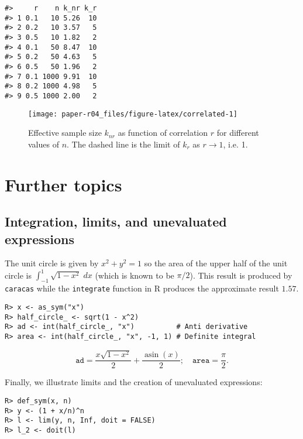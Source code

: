 \begin{verbatim}
#>     r    n k_nr k_r
#> 1 0.1   10 5.26  10
#> 2 0.2   10 3.57   5
#> 3 0.5   10 1.82   2
#> 4 0.1   50 8.47  10
#> 5 0.2   50 4.63   5
#> 6 0.5   50 1.96   2
#> 7 0.1 1000 9.91  10
#> 8 0.2 1000 4.98   5
#> 9 0.5 1000 2.00   2
\end{verbatim}

\begin{figure}[h]
\texttt{[image: paper-r04\_files/figure-latex/correlated-1]} \caption{Effective sample size $k_{nr}$ as function of correlation $r$ for different values of $n$. The dashed line is the limit of $k_r$ as $r \rightarrow 1$, i.e. 1. }\label{fig:correlated}
\end{figure}

\hypertarget{further-topics}{%
\section{Further topics}\label{further-topics}}

\hypertarget{integration-limits-and-unevaluated-expressions}{%
\subsection{Integration, limits, and unevaluated expressions}\label{integration-limits-and-unevaluated-expressions}}

The unit circle is given by \(x^2 + y^2 = 1\) so the area of the upper
half of the unit circle is \(\int_{-1}^1 \sqrt{1-x^2}\; dx\) (which is
known to be \(\pi/2\)). This result is produced by \texttt{caracas} while the
\texttt{integrate} function in R produces the approximate result \(1.57\).

\begin{verbatim}
R> x <- as_sym("x")
R> half_circle_ <- sqrt(1 - x^2)
R> ad <- int(half_circle_, "x")          # Anti derivative
R> area <- int(half_circle_, "x", -1, 1) # Definite integral
\end{verbatim}

\begin{equation}
\texttt{ad} = \frac{x \sqrt{1 - x^{2}}}{2} + \frac{\operatorname{asin}{\left(x \right)}}{2}; \quad
\texttt{area} = \frac{\pi}{2}.
\end{equation}

Finally, we illustrate limits and the creation of unevaluated expressions:

\begin{verbatim}
R> def_sym(x, n)
R> y <- (1 + x/n)^n
R> l <- lim(y, n, Inf, doit = FALSE)
R> l_2 <- doit(l)
\end{verbatim}

